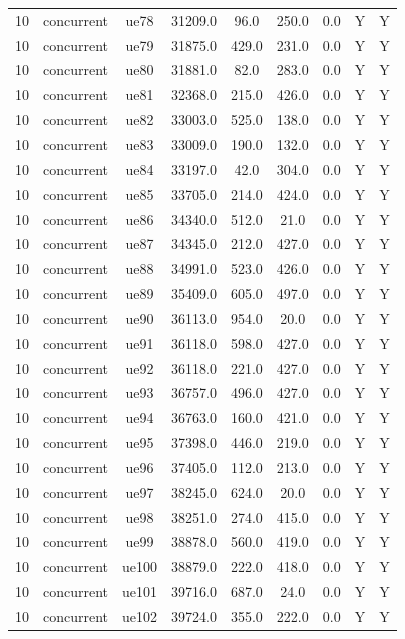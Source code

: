 \begin{table}[ht]
\begin{tabular}{|c|c|c|c|c|c|c|c|c|}
10 & concurrent & ue78 & 31209.0 & 96.0 & 250.0 & 0.0 & Y & Y \\
10 & concurrent & ue79 & 31875.0 & 429.0 & 231.0 & 0.0 & Y & Y \\
10 & concurrent & ue80 & 31881.0 & 82.0 & 283.0 & 0.0 & Y & Y \\
10 & concurrent & ue81 & 32368.0 & 215.0 & 426.0 & 0.0 & Y & Y \\
10 & concurrent & ue82 & 33003.0 & 525.0 & 138.0 & 0.0 & Y & Y \\
10 & concurrent & ue83 & 33009.0 & 190.0 & 132.0 & 0.0 & Y & Y \\
10 & concurrent & ue84 & 33197.0 & 42.0 & 304.0 & 0.0 & Y & Y \\
10 & concurrent & ue85 & 33705.0 & 214.0 & 424.0 & 0.0 & Y & Y \\
10 & concurrent & ue86 & 34340.0 & 512.0 & 21.0 & 0.0 & Y & Y \\
10 & concurrent & ue87 & 34345.0 & 212.0 & 427.0 & 0.0 & Y & Y \\
10 & concurrent & ue88 & 34991.0 & 523.0 & 426.0 & 0.0 & Y & Y \\
10 & concurrent & ue89 & 35409.0 & 605.0 & 497.0 & 0.0 & Y & Y \\
10 & concurrent & ue90 & 36113.0 & 954.0 & 20.0 & 0.0 & Y & Y \\
10 & concurrent & ue91 & 36118.0 & 598.0 & 427.0 & 0.0 & Y & Y \\
10 & concurrent & ue92 & 36118.0 & 221.0 & 427.0 & 0.0 & Y & Y \\
10 & concurrent & ue93 & 36757.0 & 496.0 & 427.0 & 0.0 & Y & Y \\
10 & concurrent & ue94 & 36763.0 & 160.0 & 421.0 & 0.0 & Y & Y \\
10 & concurrent & ue95 & 37398.0 & 446.0 & 219.0 & 0.0 & Y & Y \\
10 & concurrent & ue96 & 37405.0 & 112.0 & 213.0 & 0.0 & Y & Y \\
10 & concurrent & ue97 & 38245.0 & 624.0 & 20.0 & 0.0 & Y & Y \\
10 & concurrent & ue98 & 38251.0 & 274.0 & 415.0 & 0.0 & Y & Y \\
10 & concurrent & ue99 & 38878.0 & 560.0 & 419.0 & 0.0 & Y & Y \\
10 & concurrent & ue100 & 38879.0 & 222.0 & 418.0 & 0.0 & Y & Y \\
10 & concurrent & ue101 & 39716.0 & 687.0 & 24.0 & 0.0 & Y & Y \\
10 & concurrent & ue102 & 39724.0 & 355.0 & 222.0 & 0.0 & Y & Y \\

\end{tabular}
\end{table}
